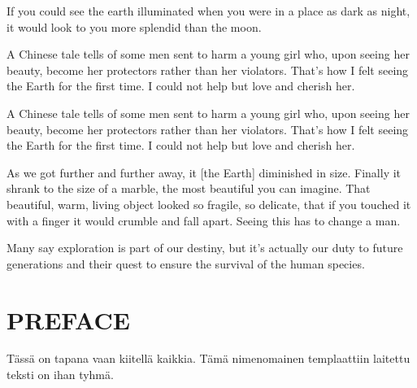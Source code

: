 
\noindent
If you could see the earth illuminated when you were in a place as dark as night, it would look to you more splendid than the moon.
\noindent

A Chinese tale tells of some men sent to harm a young girl who, upon seeing her beauty, become her protectors rather than her violators. That's how I felt seeing the Earth for the first time. I could not help but love and cherish her.
\noindent

A Chinese tale tells of some men sent to harm a young girl who, upon seeing her beauty, become her protectors rather than her violators. That's how I felt seeing the Earth for the first time. I could not help but love and cherish her.
\noindent

As we got further and further away, it [the Earth] diminished in size. Finally it shrank to the size of a marble, the most beautiful you can imagine. That beautiful, warm, living object looked so fragile, so delicate, that if you touched it with a finger it would crumble and fall apart. Seeing this has to change a man.

\noindent
Many say exploration is part of our destiny, but it’s actually our duty to future generations and their quest to ensure the survival of the human species.

\newpage
 
\chapter*{PREFACE}
\noindent 

Tässä on tapana vaan kiitellä kaikkia. Tämä nimenomainen templaattiin laitettu teksti on ihan tyhmä.
 
\newpage
\tableofcontents

%  
%  
%  
 
 
\newpage
\renewcommand{\chaptermark}[1]{\markboth{\thechapter. \ #1}{}}
\renewcommand{\sectionmark}[1]{\markright{}{}}
\lhead{\fancyplain{}{\leftmark}}
 
